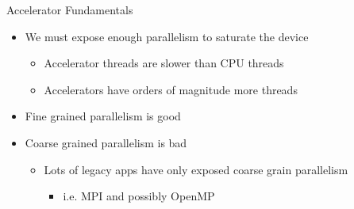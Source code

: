 \documentclass[10pt,t]{beamer}
\begin{document}
\begin{frame}{Accelerator Fundamentals}
  \begin{itemize}
    \item We must expose enough parallelism to saturate the device
      \begin{itemize}
        \item Accelerator threads are slower than CPU threads
        \item Accelerators have orders of magnitude more threads
      \end{itemize}
    \item Fine grained parallelism is good
    \item Coarse grained parallelism is bad
      \begin{itemize}
        \item Lots of legacy apps have only exposed coarse grain parallelism
          \begin{itemize}
            \item i.e. MPI and possibly OpenMP
          \end{itemize}
      \end{itemize}
  \end{itemize}
\end{frame}
\end{document}
